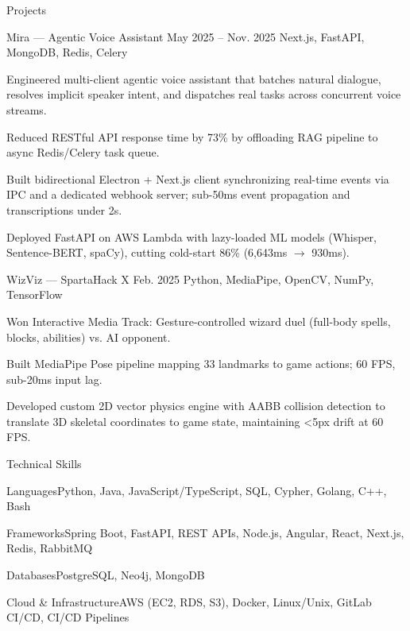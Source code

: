 \documentclass[
	11pt
]{../../resume}
\begin{document}
	\begin{rSection}{P}{rojects}
		\begin{rSectionEntry}
			{Mira --- Agentic Voice Assistant}
			{May 2025 -- Nov. 2025}
			{}
			{Next.js, FastAPI, MongoDB, Redis, Celery}
			{}

			\item Engineered multi-client agentic voice assistant that batches natural dialogue, resolves implicit speaker intent, and dispatches real tasks across concurrent voice streams.
			\item Reduced RESTful API response time by 73\% by offloading RAG pipeline to async Redis/Celery task queue.
			\item Built bidirectional Electron + Next.js client synchronizing real-time events via IPC and a dedicated webhook server; sub-50ms event propagation and transcriptions under 2s.
			\item Deployed FastAPI on AWS Lambda with lazy-loaded ML models (Whisper, Sentence-BERT, spaCy), cutting cold-start 86\% (6{,}643ms $\rightarrow$ 930ms).
		\end{rSectionEntry}

		\begin{rSectionEntry}
			{WizViz --- SpartaHack X}
			{Feb. 2025}
			{}
			{Python, MediaPipe, OpenCV, NumPy, TensorFlow}
			{}

			\item Won Interactive Media Track: Gesture-controlled wizard duel (full-body spells, blocks, abilities) vs. AI opponent.
			\item Built MediaPipe Pose pipeline mapping 33 landmarks to game actions; 60 FPS, sub-20ms input lag.
			\item Developed custom 2D vector physics engine with AABB collision detection to translate 3D skeletal coordinates to game state, maintaining \textless5px drift at 60 FPS.
		\end{rSectionEntry}
	\end{rSection}

	\begin{rSection}{T}{echnical Skills}
		\begin{rSet}{Languages}{Python, Java, JavaScript/TypeScript, SQL, Cypher, Golang, C++, Bash}
		\end{rSet}
		\begin{rSet}{Frameworks}{Spring Boot, FastAPI, REST APIs, Node.js, Angular, React, Next.js, Redis, RabbitMQ}
		\end{rSet}
		\begin{rSet}{Databases}{PostgreSQL, Neo4j, MongoDB}
		\end{rSet}
		\begin{rSet}{Cloud \& Infrastructure}{AWS (EC2, RDS, S3), Docker, Linux/Unix, GitLab CI/CD, CI/CD Pipelines}
		\end{rSet}
	\end{rSection}
\end{document}
